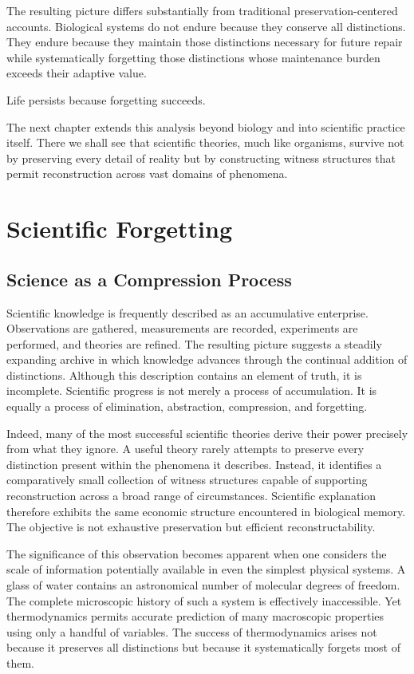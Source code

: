 \documentclass[12pt,oneside]{book}
\theoremstyle{plain} \newtheorem{theorem}{Theorem}[chapter] \newtheorem{lemma}[theorem]{Lemma} \newtheorem{proposition}[theorem]{Proposition} \newtheorem{corollary}[theorem]{Corollary}
\theoremstyle{definition} \newtheorem{definition}[theorem]{Definition} \newtheorem{axiom}[theorem]{Axiom} \newtheorem{construction}[theorem]{Construction}
\theoremstyle{remark} \newtheorem{remark}[theorem]{Remark} \newtheorem{example}[theorem]{Example}
\begin{document}
The resulting picture differs substantially from traditional preservation-centered accounts. Biological systems do not endure because they conserve all distinctions. They endure because they maintain those distinctions necessary for future repair while systematically forgetting those distinctions whose maintenance burden exceeds their adaptive value.

Life persists because forgetting succeeds.

The next chapter extends this analysis beyond biology and into scientific practice itself. There we shall see that scientific theories, much like organisms, survive not by preserving every detail of reality but by constructing witness structures that permit reconstruction across vast domains of phenomena.

\chapter{Scientific Forgetting}

\section{Science as a Compression Process}

Scientific knowledge is frequently described as an accumulative enterprise. Observations are gathered, measurements are recorded, experiments are performed, and theories are refined. The resulting picture suggests a steadily expanding archive in which knowledge advances through the continual addition of distinctions. Although this description contains an element of truth, it is incomplete. Scientific progress is not merely a process of accumulation. It is equally a process of elimination, abstraction, compression, and forgetting.

Indeed, many of the most successful scientific theories derive their power precisely from what they ignore. A useful theory rarely attempts to preserve every distinction present within the phenomena it describes. Instead, it identifies a comparatively small collection of witness structures capable of supporting reconstruction across a broad range of circumstances. Scientific explanation therefore exhibits the same economic structure encountered in biological memory. The objective is not exhaustive preservation but efficient reconstructability.

The significance of this observation becomes apparent when one considers the scale of information potentially available in even the simplest physical systems. A glass of water contains an astronomical number of molecular degrees of freedom. The complete microscopic history of such a system is effectively inaccessible. Yet thermodynamics permits accurate prediction of many macroscopic properties using only a handful of variables. The success of thermodynamics arises not because it preserves all distinctions but because it systematically forgets most of them.
\end{document}
